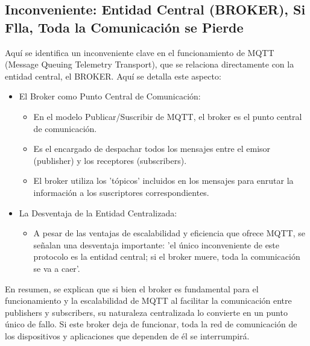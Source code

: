 \documentclass{report}
\begin{document}
\subsection{Inconveniente: Entidad Central (BROKER), Si Flla, Toda la Comunicación se Pierde}
Aquí se identifica un inconveniente clave en el funcionamiento de MQTT (Message Queuing Telemetry Transport), que 
se relaciona directamente con la entidad central, el BROKER.
Aquí se detalla este aspecto:
\begin{itemize}
    \item El Broker como Punto Central de Comunicación:
        \begin{itemize}
            \item En el modelo Publicar/Suscribir de MQTT, el broker es el punto central de comunicación.
            \item Es el encargado de despachar todos los mensajes entre el emisor (publisher) y los receptores (subscribers).
            \item El broker utiliza los 'tópicos' incluidos en los mensajes para enrutar la información a los suscriptores correspondientes.
        \end{itemize}
    \item La Desventaja de la Entidad Centralizada:
        \begin{itemize}
            \item A pesar de las ventajas de escalabilidad y eficiencia que ofrece MQTT, se  señalan una desventaja importante: 
            'el único inconveniente de este protocolo es la entidad central; si el broker muere, toda la comunicación se va a caer'.       
        \end{itemize}
\end{itemize}
En resumen, se  explican que si bien el broker es fundamental para el funcionamiento y la escalabilidad de MQTT al facilitar 
la comunicación entre publishers y subscribers, su naturaleza centralizada lo convierte en un punto único de fallo. Si este broker 
deja de funcionar, toda la red de comunicación de los dispositivos y aplicaciones que dependen de él se interrumpirá.
\end{document}
